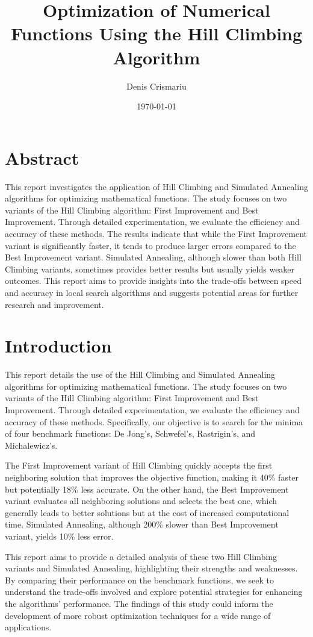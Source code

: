 \documentclass{article}
\title{Optimization of Numerical Functions Using the Hill Climbing Algorithm}
\author{Denis Crismariu}
\date{\today}
\begin{document}
\maketitle

\section{Abstract}
This report investigates the application of Hill Climbing and Simulated Annealing algorithms for optimizing mathematical functions. The study focuses on two variants of the Hill Climbing algorithm: First Improvement and Best Improvement. Through detailed experimentation, we evaluate the efficiency and accuracy of these methods. The results indicate that while the First Improvement variant is significantly faster, it tends to produce larger errors compared to the Best Improvement variant. Simulated Annealing, although slower than both Hill Climbing variants, sometimes provides better results but usually yields weaker outcomes. This report aims to provide insights into the trade-offs between speed and accuracy in local search algorithms and suggests potential areas for further research and improvement.

\section{Introduction}
This report details the use of the Hill Climbing and Simulated Annealing algorithms for optimizing mathematical functions. The study focuses on two variants of the Hill Climbing algorithm: First Improvement and Best Improvement. Through detailed experimentation, we evaluate the efficiency and accuracy of these methods. Specifically, our objective is to search for the minima of four benchmark functions: De Jong’s, Schwefel’s, Rastrigin’s, and Michalewicz’s.

The First Improvement variant of Hill Climbing quickly accepts the first neighboring solution that improves the objective function, making it 40\% faster but potentially 18\% less accurate. On the other hand, the Best Improvement variant evaluates all neighboring solutions and selects the best one, which generally leads to better solutions but at the cost of increased computational time. Simulated Annealing, although 200\% slower than Best Improvement variant, yields 10\% less error.

This report aims to provide a detailed analysis of these two Hill Climbing variants and Simulated Annealing, highlighting their strengths and weaknesses. By comparing their performance on the benchmark functions, we seek to understand the trade-offs involved and explore potential strategies for enhancing the algorithms' performance. The findings of this study could inform the development of more robust optimization techniques for a wide range of applications.
\end{document}
